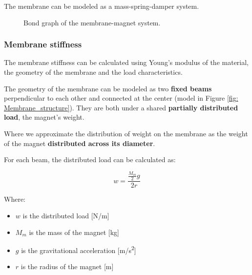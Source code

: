 \begin{samepage}
    The membrane can be modeled as a mass-spring-damper system.
    \nopagebreak    

    \begin{figure}[H]
        \centering
        \caption{Bond graph of the membrane-magnet system.}
        \label{fig:Membrane_bond_graph}
    \end{figure}
\end{samepage}

\subsubsection{Membrane stiffness}
\label{sec: Membrane_stiffness}
The membrane stiffness can be calculated using Young's modulus of the material, the geometry of the membrane and the load characteristics.

The geometry of the membrane can be modeled as two \textbf{fixed beams} perpendicular to each other and connected at the center (model in Figure \ref{fig: Membrane_structure}).
They are both under a shared \textbf{partially distributed load}, the magnet's weight.

Where we approximate the distribution of weight on the membrane as the weight of the magnet \textbf{distributed across its diameter}.

\begin{samepage}
    For each beam, the distributed load can be calculated as:
    \nopagebreak

    \begin{equation*}
        w = \frac{\frac{M_{m}}{2} g}{2 r}
    \end{equation*}
    \nopagebreak

    Where:
    \nopagebreak

    \begin{itemize}
        \item $w$ is the distributed load [N/m]
        \item $M_m$ is the mass of the magnet [kg]
        \item $g$ is the gravitational acceleration [m/s\textsuperscript{2}]
        \item $r$ is the radius of the magnet [m]
    \end{itemize}
\end{samepage}


